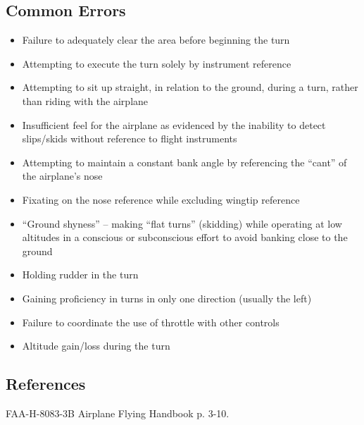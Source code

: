 \subsection{Common Errors}

\begin{itemize}
  \item Failure to adequately clear the area before beginning the turn
  \item Attempting to execute the turn solely by instrument reference
  \item Attempting to sit up straight, in relation to the ground, during a
    turn, rather than riding with the airplane
  \item Insufficient feel for the airplane as evidenced by the inability to
    detect slips/skids without reference to flight instruments
  \item Attempting to maintain a constant bank angle by referencing the
    ``cant'' of the airplane's nose
  \item Fixating on the nose reference while excluding wingtip reference
  \item ``Ground shyness'' -- making ``flat turns'' (skidding) while operating
    at low altitudes in a conscious or subconscious effort to avoid banking
    close to the ground
  \item Holding rudder in the turn
  \item Gaining proficiency in turns in only one direction (usually the left)
  \item Failure to coordinate the use of throttle with other controls
  \item Altitude gain/loss during the turn
\end{itemize}

\subsection{References}

FAA-H-8083-3B Airplane Flying Handbook p. 3-10.

